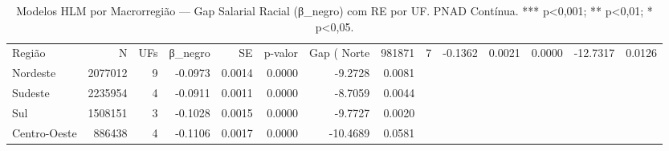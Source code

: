 \begin{table}
\caption{Modelos HLM por Macrorregião — Gap Salarial Racial (β_negro) com RE por UF. PNAD Contínua. *** p<0,001; ** p<0,01; * p<0,05.}
\label{tab:regional_hlm}
\begin{tabular}{lrrrrrrr}
\toprule
Região & N & UFs & β_negro & SE & p-valor & Gap (%
\midrule
Norte & 981871 & 7 & -0.1362 & 0.0021 & 0.0000 & -12.7317 & 0.0126 \\
Nordeste & 2077012 & 9 & -0.0973 & 0.0014 & 0.0000 & -9.2728 & 0.0081 \\
Sudeste & 2235954 & 4 & -0.0911 & 0.0011 & 0.0000 & -8.7059 & 0.0044 \\
Sul & 1508151 & 3 & -0.1028 & 0.0015 & 0.0000 & -9.7727 & 0.0020 \\
Centro-Oeste & 886438 & 4 & -0.1106 & 0.0017 & 0.0000 & -10.4689 & 0.0581 \\
\bottomrule
\end{tabular}
\end{table}

